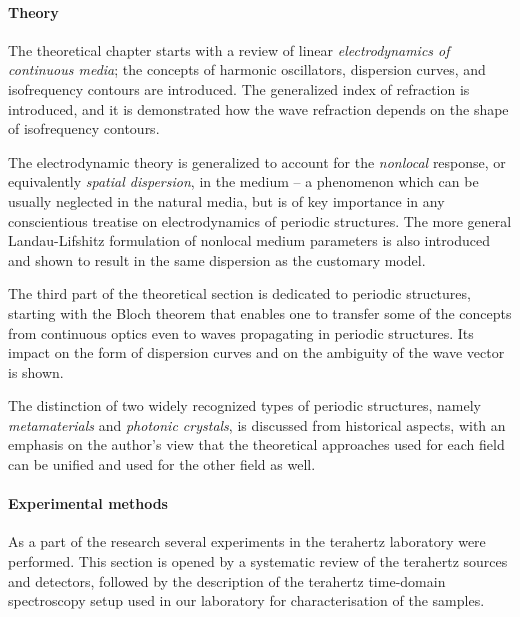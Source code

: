 \paragraph{Theory} %
The theoretical chapter starts with a review of linear \textit{electrodynamics of continuous media}; the concepts of harmonic oscillators, dispersion curves, and isofrequency contours are introduced. The generalized index of refraction is introduced, and it is demonstrated how the wave refraction depends on the shape of isofrequency contours.

The electrodynamic theory is generalized to account for the \textit{nonlocal} response, or equivalently \textit{spatial dispersion}, in the medium -- a phenomenon which can be usually neglected in the natural media, but is of key importance in any conscientious treatise on electrodynamics of periodic structures.
The more general Landau-Lifshitz formulation of nonlocal medium parameters is also introduced and shown to result in the same dispersion as the customary model.  

The third part of the theoretical section is dedicated to periodic structures, starting with the Bloch theorem that enables one to transfer some of the concepts from continuous optics even to waves propagating in periodic structures. Its impact on the form of dispersion curves and on the ambiguity of the wave vector is shown.

The distinction of two widely recognized types of periodic structures, namely \textit{metamaterials} and \textit{photonic crystals}, is discussed from historical
aspects, with an emphasis on the author's view that the theoretical approaches used for each field can be unified and used for the other field as well.

\paragraph{Experimental methods} %
As a part of the research several experiments in the terahertz laboratory were performed. This section is opened by a systematic review of the terahertz sources and detectors, followed by the description of the terahertz time-domain spectroscopy setup used in our laboratory for characterisation of the samples. 

